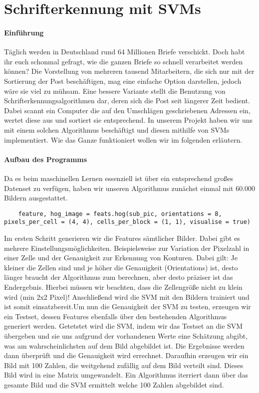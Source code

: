 \section{Schrifterkennung mit SVMs}

\paragraph{Einführung}
Täglich werden in Deutschland rund 64 Millionen Briefe verschickt. Doch habt ihr euch schonmal gefragt, wie die ganzen Briefe so schnell verarbeitet werden können? Die Vorstellung von mehreren tausend Mitarbeitern, die sich nur mit der Sortierung der Post beschäftigen, mag eine einfache Option darstellen, jedoch wäre sie viel zu mühsam. Eine bessere Variante stellt die Benutzung von Schrifterkennungsalgorithmen dar, deren sich die Post seit längerer Zeit bedient. Dabei scannt ein Computer die auf den Umschlägen geschriebenen Adressen ein, wertet diese aus und sortiert sie entsprechend. In unserem Projekt haben wir uns mit einem solchen Algorithmus beschäftigt und diesen mithilfe von SVMs implementiert. Wie das Ganze funktioniert wollen wir im folgenden erläutern.

\paragraph{Aufbau des Programms}

Da es beim maschinellen Lernen essenziell ist über ein entsprechend großes Datenset zu verfügen, haben wir unseren Algorithmus zunächst einmal mit 60.000 Bildern ausgestattet. 

\begin{verbatim}
	feature, hog_image = feats.hog(sub_pic, orientations = 8, pixels_per_cell = (4, 4), cells_per_block = (1, 1), visualise = true)
\end{verbatim}
Im ersten Schritt generieren wir die Features sämtlicher Bilder. Dabei gibt es mehrere Einstellungsmöglichkeiten. Beispielsweise zur Variation der Pixelzahl in einer Zelle und der Genauigkeit zur Erkennung von Konturen. Dabei gilt: Je kleiner die Zellen sind und je höher die Genauigkeit (Orientations) ist, desto länger braucht der Algorithmus zum berechnen, aber desto präziser ist das Endergebnis. Hierbei müssen wir beachten, dass die Zellengröße nicht zu klein wird (min 2x2 Pixel)!
Anschließend wird die SVM mit den Bildern trainiert und ist somit einsatzbereit.Um nun die Genauigkeit der SVM zu testen, erzeugen wir ein Testset, dessen Features ebenfalls über den bestehenden Algorithmus generiert werden. Getetstet wird die SVM, indem wir das Testset an die SVM übergeben und sie uns aufgrund der vorhandenen Werte eine Schätzung abgibt, was am wahrscheinlichsten auf dem Bild abgebildet ist. Die Ergebnisse werden dann überprüft und die Genauigkeit wird errechnet.
Daraufhin erzeugen wir ein Bild mit 100 Zahlen, die weitgehend zufällig auf dem Bild verteilt sind. Dieses Bild wird in eine Matrix umgewandelt. Ein Algorithmus iterriert dann über das gesamte Bild und die SVM ermittelt welche 100 Zahlen abgebildet sind.


